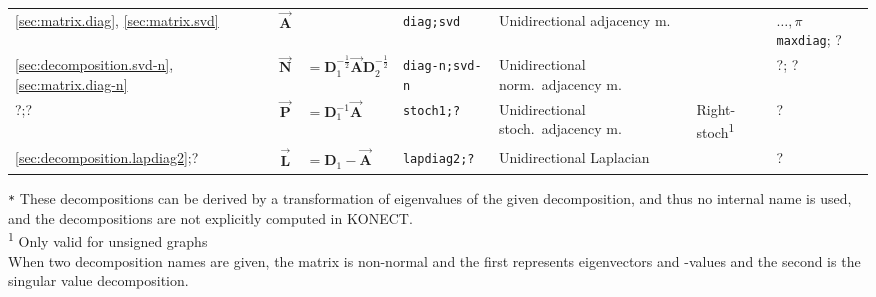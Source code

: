 \documentclass{article}
\begin{document}
\begin{table}
{{\begin{tabular}{ l c@{\;}l l l l l }
    \midrule \midrule
    
    \ref{sec:matrix.diag}, \ref{sec:matrix.svd} & $\vec{\mathbf A}$ && \texttt{diag;svd} & Unidirectional adjacency m. &
    &  $\ldots, \pi$ \texttt{maxdiag}; ? \\
    \ref{sec:decomposition.svd-n}, \ref{sec:matrix.diag-n} & $\vec{\mathbf N}$&$=\mathbf D_1^{-\frac 12}\vec{\mathbf A}\mathbf D_2^{-\frac 12}$ & \texttt{diag-n;svd-n} & Unidirectional norm.\ adjacency m. &
    & ?; ?  \\
    ?;? & $\vec{\mathbf P}$&$ = \mathbf D_1^{-1}\vec{\mathbf A}$ & \texttt{stoch1;?} & Unidirectional stoch.\ adjacency m. &
    Right-stoch\textsuperscript{1} 	& ? \\

    \midrule

    \ref{sec:decomposition.lapdiag2};? & $\vec{\mathbf L}$&$ = \mathbf D_1 - \vec{\mathbf A}$ & \texttt{lapdiag2;?} & Unidirectional Laplacian &
    & ? \\ 

    \bottomrule
  \end{tabular}
    }
  }
  \texttt{*} These decompositions can be derived by a transformation of eigenvalues of the given decomposition, and thus no internal name is used, and the decompositions are not explicitly computed in KONECT.  \\ 
  \textsuperscript{1} Only valid for unsigned graphs \\
  When two decomposition names are given, the matrix is non-normal and
  the first represents eigenvectors and -values and the second is the
  singular value decomposition.
\end{table}
\end{document}
